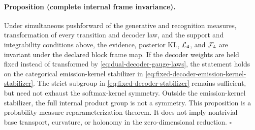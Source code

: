 \paragraph{Proposition (complete internal frame invariance).}
Under simultaneous pushforward of the generative and recognition measures, transformation of every transition and decoder law, and the support and integrability conditions above, the evidence, posterior KL, $\mathcal L_4$, and $\mathcal F_4$ are invariant under the declared block frame map. If the decoder weights are held fixed instead of transformed by \cref{eq:dual-decoder-gauge-laws}, the statement holds on the categorical emission-kernel stabilizer in \cref{eq:fixed-decoder-emission-kernel-stabilizer}. The strict subgroup in \cref{eq:fixed-decoder-stabilizer} remains sufficient, but need not exhaust the softmax-kernel symmetry. Outside the emission-kernel stabilizer, the full internal product group is not a symmetry. This proposition is a probability-measure reparameterization theorem. It does not imply nontrivial base transport, curvature, or holonomy in the zero-dimensional reduction. \hfill$\square$
